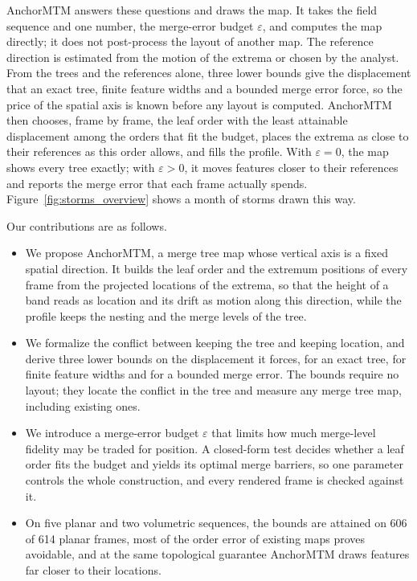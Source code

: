 \documentclass[preprint]{vgtc}   %
\begin{document}
AnchorMTM answers these questions and draws the map. It takes the field sequence and one number, the merge-error budget $\varepsilon$, and computes the map directly; it does not post-process the layout of another map. The reference direction is estimated from the motion of the extrema or chosen by the analyst. From the trees and the references alone, three lower bounds give the displacement that an exact tree, finite feature widths and a bounded merge error force, so the price of the spatial axis is known before any layout is computed. AnchorMTM then chooses, frame by frame, the leaf order with the least attainable displacement among the orders that fit the budget, places the extrema as close to their references as this order allows, and fills the profile. With $\varepsilon=0$, the map shows every tree exactly; with $\varepsilon>0$, it moves features closer to their references and reports the merge error that each frame actually spends. Figure~\ref{fig:storms_overview} shows a month of storms drawn this way.

Our contributions are as follows.
\begin{itemize}
\setlength{\itemsep}{2pt}
\setlength{\parsep}{0pt}
\item We propose AnchorMTM, a merge tree map whose vertical axis is a fixed spatial direction. It builds the leaf order and the extremum positions of every frame from the projected locations of the extrema, so that the height of a band reads as location and its drift as motion along this direction, while the profile keeps the nesting and the merge levels of the tree.
\item We formalize the conflict between keeping the tree and keeping location, and derive three lower bounds on the displacement it forces, for an exact tree, for finite feature widths and for a bounded merge error. The bounds require no layout; they locate the conflict in the tree and measure any merge tree map, including existing ones.
\item We introduce a merge-error budget $\varepsilon$ that limits how much merge-level fidelity may be traded for position. A closed-form test decides whether a leaf order fits the budget and yields its optimal merge barriers, so one parameter controls the whole construction, and every rendered frame is checked against it.
\item On five planar and two volumetric sequences, the bounds are attained on 606 of 614 planar frames, most of the order error of existing maps proves avoidable, and at the same topological guarantee AnchorMTM draws features far closer to their locations.
\end{itemize}
\end{document}
